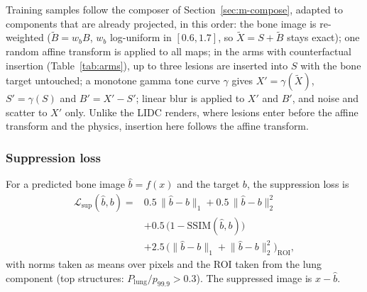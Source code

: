 Training samples follow the composer of Section~\ref{sec:m-compose}, adapted to components that are already projected, in this order: the
bone image is re-weighted ($\tilde B=w_bB$, $w_b$ log-uniform in $[0.6,1.7]$, so $\tilde X=S+\tilde B$ stays exact); one random affine
transform is applied to all maps; in the arms with counterfactual insertion (Table~\ref{tab:arms}), up to three lesions are inserted into
$S$ with the bone target untouched; a monotone gamma tone curve $\gamma$ gives $X'=\gamma(\tilde X)$, $S'=\gamma(S)$ and $B'=X'-S'$;
linear blur is applied to $X'$ and $B'$, and noise and scatter to $X'$ only. Unlike the LIDC renders, where lesions enter before the
affine transform and the physics, insertion here follows the affine transform.

\subsubsection{Suppression loss}
For a predicted bone image $\hat b=f(x)$ and the target $b$, the suppression loss is
\begin{equation}
\begin{split}
\mathcal{L}_{\mathrm{sup}}(\hat b,b)={}&0.5\,\lVert\hat b-b\rVert_1+0.5\,\lVert\hat b-b\rVert_2^2\\
&+0.5\,\big(1-\mathrm{SSIM}(\hat b,b)\big)\\
&+2.5\,\big(\lVert\hat b-b\rVert_1+\lVert\hat b-b\rVert_2^2\big)_{\mathrm{ROI}},
\end{split}
\label{eq:loss}
\end{equation}
with norms taken as means over pixels and the ROI taken from the lung component (top structures: $P_{\mathrm{lung}}/p_{99.9}>0.3$). The
suppressed image is $x-\hat b$.

